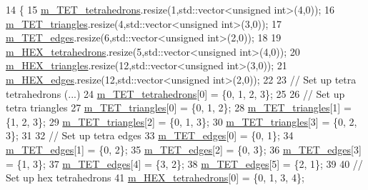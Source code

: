 \begin{DoxyCode}
14 \{
15     \hyperlink{classcarl_1_1_intersection___tools_a6e9a49f3b382810c884ba46b791bfcb8}{m\_TET\_tetrahedrons}.resize(1,std::vector<unsigned int>(4,0));
16     \hyperlink{classcarl_1_1_intersection___tools_a54e026b256ab6894b1f77950a425b1eb}{m\_TET\_triangles}.resize(4,std::vector<unsigned int>(3,0));
17     \hyperlink{classcarl_1_1_intersection___tools_a153baf989b64fb7033e42ba2342e0fc5}{m\_TET\_edges}.resize(6,std::vector<unsigned int>(2,0));
18 
19     \hyperlink{classcarl_1_1_intersection___tools_af74ec1bcb1a896df19642d340dd2762c}{m\_HEX\_tetrahedrons}.resize(5,std::vector<unsigned int>(4,0));
20     \hyperlink{classcarl_1_1_intersection___tools_aca79d0350f0969670dd9d06814c26583}{m\_HEX\_triangles}.resize(12,std::vector<unsigned int>(3,0));
21     \hyperlink{classcarl_1_1_intersection___tools_a418dc03e4edc3f5bba1f78f6fc5afe71}{m\_HEX\_edges}.resize(12,std::vector<unsigned int>(2,0));
22 
23     \textcolor{comment}{// Set up tetra tetrahedrons (...)}
24     \hyperlink{classcarl_1_1_intersection___tools_a6e9a49f3b382810c884ba46b791bfcb8}{m\_TET\_tetrahedrons}[0] = \{0, 1, 2, 3\};
25 
26     \textcolor{comment}{// Set up tetra triangles}
27     \hyperlink{classcarl_1_1_intersection___tools_a54e026b256ab6894b1f77950a425b1eb}{m\_TET\_triangles}[0] = \{0, 1, 2\};
28     \hyperlink{classcarl_1_1_intersection___tools_a54e026b256ab6894b1f77950a425b1eb}{m\_TET\_triangles}[1] = \{1, 2, 3\};
29     \hyperlink{classcarl_1_1_intersection___tools_a54e026b256ab6894b1f77950a425b1eb}{m\_TET\_triangles}[2] = \{0, 1, 3\};
30     \hyperlink{classcarl_1_1_intersection___tools_a54e026b256ab6894b1f77950a425b1eb}{m\_TET\_triangles}[3] = \{0, 2, 3\};
31 
32     \textcolor{comment}{// Set up tetra edges}
33     \hyperlink{classcarl_1_1_intersection___tools_a153baf989b64fb7033e42ba2342e0fc5}{m\_TET\_edges}[0] = \{0, 1\};
34     \hyperlink{classcarl_1_1_intersection___tools_a153baf989b64fb7033e42ba2342e0fc5}{m\_TET\_edges}[1] = \{0, 2\};
35     \hyperlink{classcarl_1_1_intersection___tools_a153baf989b64fb7033e42ba2342e0fc5}{m\_TET\_edges}[2] = \{0, 3\};
36     \hyperlink{classcarl_1_1_intersection___tools_a153baf989b64fb7033e42ba2342e0fc5}{m\_TET\_edges}[3] = \{1, 3\};
37     \hyperlink{classcarl_1_1_intersection___tools_a153baf989b64fb7033e42ba2342e0fc5}{m\_TET\_edges}[4] = \{3, 2\};
38     \hyperlink{classcarl_1_1_intersection___tools_a153baf989b64fb7033e42ba2342e0fc5}{m\_TET\_edges}[5] = \{2, 1\};
39 
40     \textcolor{comment}{// Set up hex tetrahedrons}
41     \hyperlink{classcarl_1_1_intersection___tools_af74ec1bcb1a896df19642d340dd2762c}{m\_HEX\_tetrahedrons}[0] = \{0, 1, 3, 4\};

\end{DoxyCode}
